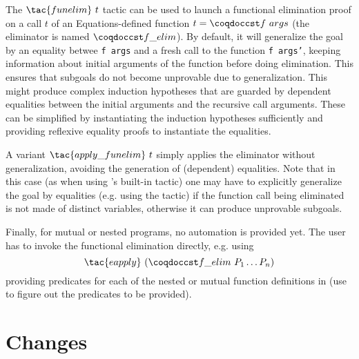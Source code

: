 The $\tac{funelim}~t$ tactic can be used to launch a functional
elimination proof on a call $t$ of an Equations-defined function $t =
\cst{f}~args$ (the eliminator is named $\cst{f\_elim}$). By default, it will
generalize the goal by an equality betwee \texttt{f args} and a fresh
call to the function \texttt{f args'}, keeping information about initial
arguments of the function before doing elimination. This ensures that
subgoals do not become unprovable due to generalization. This might
produce complex induction hypotheses that are guarded by dependent
equalities between the initial arguments and the recursive call
arguments. These can be simplified by instantiating the induction
hypotheses sufficiently and providing reflexive equality proofs to
instantiate the equalities.

A variant $\tac{apply\_funelim}~t$ simply applies the
eliminator without generalization, avoiding the generation of
(dependent) equalities. Note that in this case (as when using \Coq's
built-in  tactic) one may have to explicitly
generalize the goal by equalities (e.g. using the 
tactic) if the function call being eliminated is not made of distinct
variables, otherwise it can produce unprovable subgoals.

Finally, for mutual or nested programs, no automation is provided yet.
The user has to invoke the functional elimination directly,
e.g. using \[\tac{eapply}~(\cst{f\_elim}~P_1 \ldots P_n)\] providing
predicates for each of the nested or mutual function definitions in
 (use   to figure out the predicates to be
provided).

\newpage
\section{Changes}

\def\issue#1{\href{https://github.com/mattam82/Coq-Equations/issues/#1}{\texttt{\##1}}}

